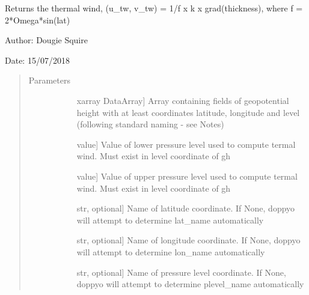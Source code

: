 \documentclass[letterpaper,10pt,english]{sphinxmanual}
\begin{document}
\begin{fulllineitems}
\label{\detokenize{diagnostic_doc:diagnostic.thermal_wind}}
Returns the thermal wind, (u\_tw, v\_tw) = 1/f x k x grad(thickness), where f = 2*Omega*sin(lat)

\begin{DUlineblock}{0em}
\item[] Author: Dougie Squire
\item[] Date: 15/07/2018
\end{DUlineblock}
\begin{quote}\begin{description}
\item[{Parameters}] \leavevmode\begin{description}
\item[{}] \leavevmode{[}xarray DataArray{]}
Array containing fields of geopotential height with at least coordinates latitude, longitude                     and level (following standard naming - see Notes)

\item[{}] \leavevmode{[}value{]}
Value of lower pressure level used to compute termal wind. Must exist in level coordinate of                     gh

\item[{}] \leavevmode{[}value{]}
Value of upper pressure level used to compute termal wind. Must exist in level coordinate of                     gh

\item[{}] \leavevmode{[}str, optional{]}
Name of latitude coordinate. If None, doppyo will attempt to determine lat\_name                     automatically

\item[{}] \leavevmode{[}str, optional{]}
Name of longitude coordinate. If None, doppyo will attempt to determine lon\_name                     automatically

\item[{}] \leavevmode{[}str, optional{]}
Name of pressure level coordinate. If None, doppyo will attempt to determine plevel\_name                     automatically


\end{description}
\end{description}
\end{quote}
\end{fulllineitems}
\end{document}
